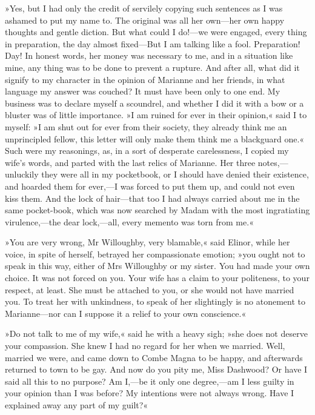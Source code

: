 »Yes, but I had only the credit of servilely copying such sentences as I was ashamed to put my name to. The original was all her own—her own happy thoughts and gentle diction. But what could I do!—we were engaged, every thing in preparation, the day almost fixed—But I am talking like a fool. Preparation! Day! In honest words, her money was necessary to me, and in a situation like mine, any thing was to be done to prevent a rupture. And after all, what did it signify to my character in the opinion of Marianne and her friends, in what language my answer was couched? It must have been only to one end. My business was to declare myself a scoundrel, and whether I did it with a bow or a bluster was of little importance. »I am ruined for ever in their opinion,« said I to myself: »I am shut out for ever from their society, they already think me an unprincipled fellow, this letter will only make them think me a blackguard one.« Such were my reasonings, as, in a sort of desperate carelessness, I copied my wife’s words, and parted with the last relics of Marianne. Her three notes,—unluckily they were all in my pocketbook, or I should have denied their existence, and hoarded them for ever,—I was forced to put them up, and could not even kiss them. And the lock of hair—that too I had always carried about me in the same pocket-book, which was now searched by Madam with the most ingratiating virulence,—the dear lock,—all, every memento was torn from me.«

»You are very wrong, Mr Willoughby, very blamable,« said Elinor, while her voice, in spite of herself, betrayed her compassionate emotion; »you ought not to speak in this way, either of Mrs Willoughby or my sister. You had made your own choice. It was not forced on you. Your wife has a claim to your politeness, to your respect, at least. She must be attached to you, or she would not have married you. To treat her with unkindness, to speak of her slightingly is no atonement to Marianne—nor can I suppose it a relief to your own conscience.«

»Do not talk to me of my wife,« said he with a heavy sigh; »she does not deserve your compassion. She knew I had no regard for her when we married. Well, married we were, and came down to Combe Magna to be happy, and afterwards returned to town to be gay. And now do you pity me, Miss Dashwood? Or have I said all this to no purpose? Am I,—be it only one degree,—am I less guilty in your opinion than I was before? My intentions were not always wrong. Have I explained away any part of my guilt?«

